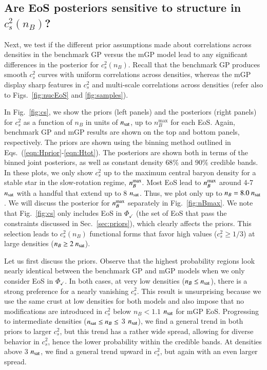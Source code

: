 \documentclass[aps,prd,nofootinbib,tightenlines,notitlepage,floatfix,superscriptaddress,showkeys,twocolumn]{revtex4-1}
\begin{document}
\subsection{Are EoS posteriors sensitive to structure in $c_s^2(n_B)$?}

Next, we test if the different prior assumptions made about correlations across densities in the benchmark GP versus the mGP model lead to any significant differences in the posterior for $c_s^2(n_B)$. Recall that the benchmark GP produces smooth $c_s^2$ curves with uniform correlations across densities, whereas the mGP display sharp features in $c_s^2$ and multi-scale correlations across densities (refer also to Figs.\ \ref{fig:nucEoS} and \ref{fig:samples}).

In Fig.~\ref{fig:cs}, we show the priors (left panels) and the posteriors (right panels) for $c_s^2$ as a function of $n_B$ in units of $n_{\rm sat}$, up to $n_B^\textrm{max}$ for each EoS. Again, benchmark GP and mGP results are shown on the top and bottom panels, respectively. The priors are shown using the binning method outlined in Eqs.\ (\ref{eqn:Hprior}-\ref{eqn:Htot}). The posteriors are shown both in terms of the binned joint posteriors, as well as constant density  $68\%$ and $90\%$ credible bands. In these plots, we only show $c_s^2$ up to the maximum central baryon density for a stable star in the slow-rotation regime, $n_B^{\rm max}$. Most EoS lead to $n_B^{\rm max}$ around 4-7 $n_{\rm sat}$ with a handful that extend up to 8 $n_{\rm sat}$.  Thus, we plot only up to $n_B = 8.0 \ n_{\rm sat}$. We will discuss the posterior for $n_B^{\rm max}$ separately in Fig.~\ref{fig:nBmax}. We note that Fig.~\ref{fig:cs} only includes EoS in $\Phi_\checkmark$ (the set of EoS that pass the constraints discussed in Sec.~\ref{sec:priors}), which clearly affects the priors. This selection leads to $c_s^2(n_B)$ functional forms that favor high values ($c_s^2 \geq 1/3$) at large densities ($n_B\geq 2\ n_{\rm sat}$). 

Let us first discuss the priors. Observe that the highest probability regions look nearly identical between the benchmark GP and mGP models when we only consider EoS in $\Phi_\checkmark$. In both cases, at very low densities ($n_B \leq n_{\rm sat}$), there is a strong preference for a nearly vanishing $c_s^2$. This result is unsurprising because we use the same crust at low densities for both models and also impose that no modifications are introduced in $c_s^2$ below $n_B< 1.1$ $n_{\rm sat}$ for mGP EoS. Progressing to intermediate densities ($n_{\rm sat} \leq n_B \leq$ 3 $n_{\rm sat}$), we find a general trend in both priors to larger $c_s^2$, but this trend has a rather wide spread, allowing for diverse behavior in $c_s^2$, hence the lower probability within the credible bands. At densities above 3 $n_{\rm sat}$, we find a general trend upward in $c_s^2$, but again with an even larger spread. 
\end{document}
